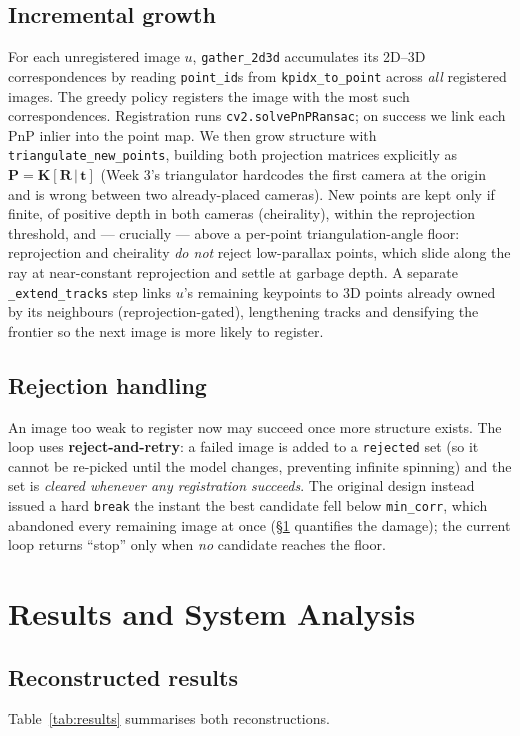 \documentclass{article} %
\begin{document}
\subsection{Incremental growth}
For each unregistered image $u$, \texttt{gather\_2d3d} accumulates its 2D--3D
correspondences by reading \texttt{point\_id}s from \texttt{kpidx\_to\_point}
across \emph{all} registered images. The greedy policy registers the image with
the most such correspondences. Registration runs \texttt{cv2.solvePnPRansac}; on
success we link each PnP inlier into the point map. We then grow structure with
\texttt{triangulate\_new\_points}, building both projection matrices explicitly
as $\mathbf{P}=\mathbf{K}[\mathbf{R}\,|\,\mathbf{t}]$ (Week 3's triangulator
hardcodes the first camera at the origin and is wrong between two already-placed
cameras). New points are kept only if finite, of positive depth in both cameras
(cheirality), within the reprojection threshold, and --- crucially --- above a
per-point triangulation-angle floor: reprojection and cheirality \emph{do not}
reject low-parallax points, which slide along the ray at near-constant
reprojection and settle at garbage depth. A separate \texttt{\_extend\_tracks}
step links $u$'s remaining keypoints to 3D points already owned by its neighbours
(reprojection-gated), lengthening tracks and densifying the frontier so the next
image is more likely to register.

\subsection{Rejection handling}
An image too weak to register now may succeed once more structure exists. The loop
uses \textbf{reject-and-retry}: a failed image is added to a \texttt{rejected} set
(so it cannot be re-picked until the model changes, preventing infinite spinning)
and the set is \emph{cleared whenever any registration succeeds}. The original
design instead issued a hard \texttt{break} the instant the best candidate fell
below \texttt{min\_corr}, which abandoned every remaining image at once
(§\ref{sec:results} quantifies the damage); the current loop returns ``stop''
only when \emph{no} candidate reaches the floor.

\section{Results and System Analysis}
\label{sec:results}

\subsection{Reconstructed results}
Table~\ref{tab:results} summarises both reconstructions.
\end{document}

